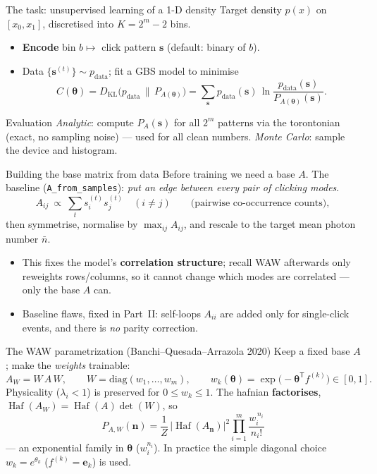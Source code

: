 \documentclass[10pt,aspectratio=169]{beamer}
\newcommand{\Haf}{\operatorname{Haf}}
\newcommand{\KL}{D_{\mathrm{KL}}}
\newcommand{\nmean}{\bar n}
\newcommand{\vs}{\mathbf{s}}
\newcommand{\vn}{\mathbf{n}}
\begin{document}
\begin{frame}{The task: unsupervised learning of a 1-D density}
Target density $p(x)$ on $[x_0,x_1]$, discretised into $K=2^m-2$ bins.
\begin{itemize}
  \item \textbf{Encode} bin $b\mapsto$ click pattern $\vs$ (default: binary of $b$).
  \item Data $\{\vs^{(t)}\}\sim p_{\mathrm{data}}$; fit a GBS model to minimise
  \[
  C(\bm\theta)=\KL\!\big(p_{\mathrm{data}}\,\|\,P_{A(\bm\theta)}\big)
  =\sum_{\vs}p_{\mathrm{data}}(\vs)\,\ln\frac{p_{\mathrm{data}}(\vs)}{P_{A(\bm\theta)}(\vs)} .
  \]
\end{itemize}
\begin{block}{Evaluation}
\emph{Analytic}: compute $P_{A}(\vs)$ for all $2^m$ patterns via the torontonian
(exact, no sampling noise) --- used for all clean numbers.
\emph{Monte Carlo}: sample the device and histogram.
\end{block}
\end{frame}

\begin{frame}{Building the base matrix from data}
Before training we need a base $A$. The baseline (\texttt{A\_from\_samples}):
\emph{put an edge between every pair of clicking modes}.
\[
A_{ij}\ \propto\ \sum_{t}s_i^{(t)}s_j^{(t)}\quad(i\ne j)\qquad\text{(pairwise co-occurrence counts)},
\]
then symmetrise, normalise by $\max_{ij}A_{ij}$, and rescale to the target mean
photon number $\nmean$.
\begin{itemize}
  \item This fixes the model's \textbf{correlation structure}; recall WAW
        afterwards only reweights rows/columns, so it cannot change which modes
        are correlated — only the base $A$ can.
  \item Baseline flaws, fixed in Part~II: self-loops $A_{ii}$ are added only for
        single-click events, and there is \emph{no} parity correction.
\end{itemize}
\end{frame}

\begin{frame}{The WAW parametrization (Banchi--Quesada--Arrazola 2020)}
Keep a fixed base $A$; make the \emph{weights} trainable:
\[
A_W=W\,A\,W,\qquad W=\mathrm{diag}(w_1,\dots,w_m),\qquad
w_k(\bm\theta)=\exp\!\big(-\bm\theta^{\mathsf T}f^{(k)}\big)\in[0,1].
\]
Physicality ($\lambda_i<1$) is preserved for $0\le w_k\le1$. The hafnian
\textbf{factorises}, $\Haf(A_W)=\Haf(A)\det(W)$, so
\[
\boxed{\;P_{A,W}(\vn)=\frac1Z\,\big|\Haf(A_{\vn})\big|^2\prod_{i=1}^m\frac{w_i^{\,n_i}}{n_i!}\;}
\]
--- an exponential family in $\bm\theta$ ($w_i^{n_i}$). In practice the simple
diagonal choice $w_k=e^{\theta_k}$ ($f^{(k)}=\mathbf e_k$) is used.
\end{frame}
\end{document}
